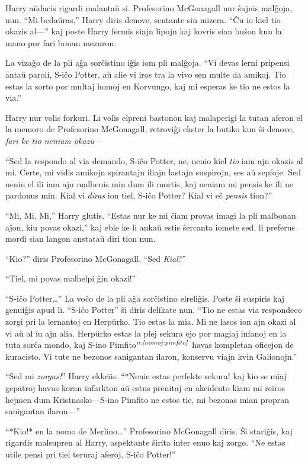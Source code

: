Harry aŭdacis rigardi malantaŭ si. Profesorino McGonagall nur ŝajnis
malĝoja, nun. ``Mi bedaŭras,'' Harry diris denove, sentante sin
mizera. ``Ĉu io kiel tio okazis al—'' kaj poste Harry fermis siajn
lipojn kaj kovris sian buŝon kun la mano por fari bonan mezuron.

La vizaĝo de la pli aĝa sorĉistino iĝis iom pli malĝoja. ``Vi devas
lerni pripensi antaŭ paroli, S-iĉo Potter, aŭ alie vi iros tra la vivo
sen multe da amikoj. Tio estas la sorto por multaj homoj en
Korvungo, kaj mi esperas ke tio ne estos la via.''

Harry nur volis forkuri. Li volis elpreni bastonon kaj malaperigi la
tutan aferon el la memoro de Profesorino McGonagall, retroviĝi ekster
la butiko kun ŝi denove, \emph{fari ke tio neniam okazu}—

``Sed la respondo al via demando, S-iĉo Potter, ne, nenio kiel
\emph{tio} iam ajn okazis al mi. Certe, mi vidis amikojn spirantajn
iliajn lastajn suspirojn, ses aŭ sepfoje. Sed neniu el ili iam ajn
malbenis min dum ili mortis, kaj neniam mi pensis ke ili ne pardonus
min. Kial vi \emph{diras} ion tiel, S-iĉo Potter? Kial vi eĉ
\emph{pensis} tion?''

``Mi, Mi, Mi,'' Harry glutis. ``Estas nur ke mi ĉiam provas imagi la
pli malbonan aĵon, kiu povas okazi,'' kaj eble ke li ankaŭ estis
ŝercanta iomete sed, li preferus mordi sian langon anstataŭ diri tion
nun.

``Kio?'' diris Profesorino McGonagall. ``Sed \emph{Kial}?''

``Tiel, mi povas malhelpi ĝin okazi!''

``S-iĉo Potter\ldots'' La voĉo de la pli aĝa sorĉistino
elreliĝis. Poste ŝi suspiris kaj genuiĝis apud li. ``S-iĉo Potter'' ŝi
diris delikate nun, ``Tio ne estas via respondeco zorgi pri la
lernantoj en Herpŭrko. Tio estas la mia. Mi ne lasos ion ajn okazi al
vi aŭ al iu ajn alia. Herpŭrko estas la plej sekura ejo por magiaj
infanoj en la tuta sorĉa mondo, kaj S-ino
Pimfito$^{\textit{n:\ref{nomoj:pimfito}}}$ havas kompletan oficejon de
kuracisto. Vi tute ne bezonos sanigantan ilaron, konservu viajn kvin
Galionojn.''

``Sed mi \emph{zorgas!}'' Harry ekkriis. ``*Nenie estas perfekte
sekura! kaj kio se miaj gepatroj havus koran infarkton aŭ estus prenitaj en
akcidento kiam mi reiros hejmen dum Kristnasko—S-ino Pimfito ne estos
tie, mi bezonas mian propran sanigantan ilaron—''

``*Kio!* en la nomo de Merlino\ldots'' Profesorino McGonagall
diris. Ŝi stariĝis, kaj rigardis malsupren al Harry, aspektante ŝirita
inter enuo kaj zorgo. ``Ne estas utile pensi pri tiel teruraj aferoj,
S-iĉo Potter!''

